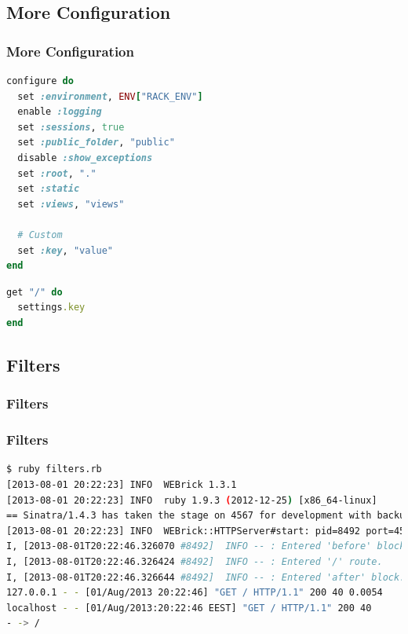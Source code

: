 \documentclass{beamer}
\begin{document}
\subsection{More Configuration} 
\begin{frame}[fragile]\frametitle{More Configuration}
 
  \begin{lstlisting}[language=ruby, escapechar={^}]
configure do
  set :environment, ENV["RACK_ENV"]
  enable :logging
  set :sessions, true
  set :public_folder, "public"
  disable :show_exceptions
  set :root, "."
  set :static
  set :views, "views"
  
  # Custom  
  set :key, "value"
end
  \end{lstlisting}
 
  \begin{lstlisting}[language=ruby, escapechar={^}]
get "/" do
  settings.key
end
  \end{lstlisting}

\end{frame}




\subsection{Filters} 
\begin{frame}\frametitle{Filters}
 
    
 
\end{frame}




\begin{frame}[fragile]\frametitle{Filters}

  \begin{lstlisting}[language=bash, basicstyle=\tiny, escapechar={^}]
$ ruby filters.rb 
[2013-08-01 20:22:23] INFO  WEBrick 1.3.1
[2013-08-01 20:22:23] INFO  ruby 1.9.3 (2012-12-25) [x86_64-linux]
== Sinatra/1.4.3 has taken the stage on 4567 for development with backup from WEBrick
[2013-08-01 20:22:23] INFO  WEBrick::HTTPServer#start: pid=8492 port=4567
I, [2013-08-01T20:22:46.326070 #8492]  INFO -- : Entered 'before' block.
I, [2013-08-01T20:22:46.326424 #8492]  INFO -- : Entered '/' route.
I, [2013-08-01T20:22:46.326644 #8492]  INFO -- : Entered 'after' block.
127.0.0.1 - - [01/Aug/2013 20:22:46] "GET / HTTP/1.1" 200 40 0.0054
localhost - - [01/Aug/2013:20:22:46 EEST] "GET / HTTP/1.1" 200 40
- -> /
  \end{lstlisting}

\end{frame}
\end{document}
